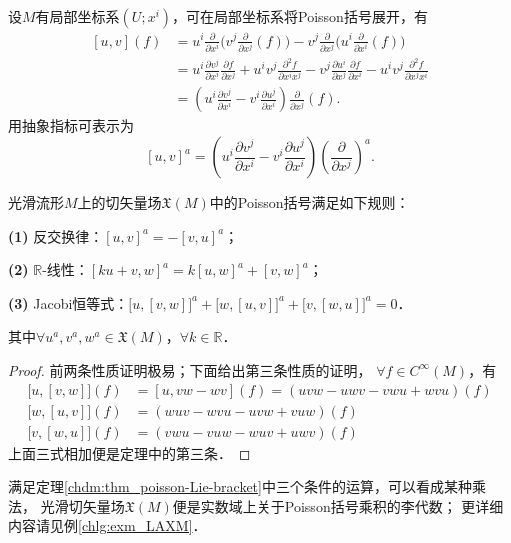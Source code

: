 设$M$有局部坐标系$(U;x^i)$，可在局部坐标系将Poisson括号展开，有
\begin{equation}\label{chdm:eqn_poisson-bracket-expand}
\begin{aligned}
    \left[u,v\right] (f) &= u^i\frac{\partial }{\partial x^i}\bigl(v^j\frac{\partial }{\partial x^j}(f)\bigr)
       - v^j\frac{\partial }{\partial x^j}\bigl(u^i\frac{\partial }{\partial x^i}(f)\bigr) \\
     &=  u^i\frac{\partial v^j}{\partial x^i} \frac{\partial f}{\partial x^j}
       + u^iv^j \frac{\partial^2 f}{\partial x^i x^j}
       - v^j\frac{\partial u^i}{\partial x^j}\frac{\partial f}{\partial x^i}
       - u^i v^j\frac{\partial^2 f}{\partial x^j x^i} \\
     &=  \left( u^i\frac{\partial v^j}{\partial x^i} 
       - v^i\frac{\partial u^j}{\partial x^i} \right)  \frac{\partial }{\partial x^j} (f) .
\end{aligned}
\end{equation}
用抽象指标可表示为
\begin{equation}\label{chdm:eqn_poisson-bracket-expand-ai}
        \left[u,v\right]^a =  \left( u^i\frac{\partial v^j}{\partial x^i} 
        - v^i\frac{\partial u^j}{\partial x^i} \right)  
        \left(\frac{\partial }{\partial x^j}\right)^a  .
\end{equation}

\begin{theorem}\label{chdm:thm_poisson-Lie-bracket}
    光滑流形$M$上的切矢量场$\mathfrak{X}(M)$中的Poisson括号满足如下规则：
    
    {\bfseries (1)} 反交换律：$\left[u,v\right]^a = -\left[v,u\right]^a$；
    
    {\bfseries (2)} $\mathbb{R}$-线性：$\left[k u+ v,w\right]^a = k \left[u,w\right]^a +\left[v,w\right]^a$；
    
    {\bfseries (3)} Jacobi恒等式：$\bigl[u, [v,w]\bigr]^a+\bigl[w, [u,v]\bigr]^a+\bigl[v, [w,u]\bigr]^a=0$．
    
    其中$\forall u^a,v^a,w^a \in \mathfrak{X}(M)$，$ \forall k \in \mathbb{R}$．
\end{theorem}
\begin{proof}
    前两条性质证明极易；下面给出第三条性质的证明，
    $\forall f\in C^\infty (M)$，有
    \begin{align*}
        \bigl[u, [v,w]\bigr](f) & =[u, vw-wv](f)=(uvw-uwv-vwu+wvu)(f) \\
        \bigl[w, [u,v]\bigr](f) & =(wuv-wvu-uvw+vuw)(f) \\
        \bigl[v, [w,u]\bigr](f) & =(vwu-vuw-wuv+uwv)(f)
    \end{align*}
    上面三式相加便是定理中的第三条．
\end{proof}
满足定理\ref{chdm:thm_poisson-Lie-bracket}中三个条件的运算，可以看成某种乘法，
光滑切矢量场$\mathfrak{X}(M)$便是实数域上关于Poisson括号乘积的{\heiti 李代数}；
更详细内容请见例\ref{chlg:exm_LAXM}． %

